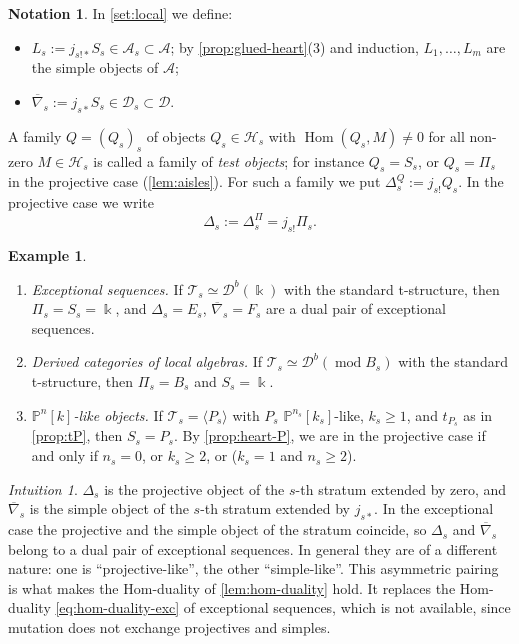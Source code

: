 \documentclass[11pt,reqno]{amsart}
\theoremstyle{plain}
\theoremstyle{definition}
\newtheorem{example}[theorem]{Example}
\newtheorem{notation}[theorem]{Notation}
\theoremstyle{remark}
\newtheorem*{intuition}{Intuition}
\newcommand{\kk}{\Bbbk}
\DeclareMathOperator{\Hom}{Hom}
\newcommand{\modd}{\operatorname{mod}}
\newcommand{\Db}{\mathcal{D}^b}
\newcommand{\thick}[1]{\langle #1\rangle}
\newcommand{\Pn}[2]{\mathbb{P}^{#1}[#2]}
\newcommand{\nablabar}{\overline{\nabla}}
\newcommand{\cD}{\mathcal{D}}
\newcommand{\cA}{\mathcal{A}}
\newcommand{\cH}{\mathcal{H}}
\newcommand{\cT}{\mathcal{T}}
\begin{document}
\begin{notation}\label{not:objects}
In \cref{set:local} we define:
\begin{itemize}
\item $L_s:=j_{s!*}S_s\in\cA_s\subset\cA$; by \cref{prop:glued-heart}(3) and induction, $L_1,\dots,L_m$ are the simple objects of $\cA$;
\item $\nablabar_s:=j_{s*}S_s\in\cD_s\subset\cD$.
\end{itemize}
A family $Q=(Q_s)_s$ of objects $Q_s\in\cH_s$ with $\Hom(Q_s,M)\ne0$ for all non-zero $M\in\cH_s$ is called a family of \emph{test objects}; for instance $Q_s=S_s$, or $Q_s=\Pi_s$ in the projective case (\cref{lem:aisles}). For such a family we put $\Delta^Q_s:=j_{s!}Q_s$. In the projective case we write
\[\Delta_s:=\Delta^\Pi_s=j_{s!}\Pi_s .\]
\end{notation}

\begin{example}\label{ex:local-settings}
\leavevmode
\begin{enumerate}
\item \emph{Exceptional sequences.} If $\cT_s\simeq\Db(\kk)$ with the standard t-structure, then $\Pi_s=S_s=\kk$, and $\Delta_s=E_s$, $\nablabar_s=F_s$ are a dual pair of exceptional sequences.
\item \emph{Derived categories of local algebras.} If $\cT_s\simeq\Db(\modd B_s)$ with the standard t-structure, then $\Pi_s=B_s$ and $S_s=\kk$.
\item \emph{$\Pn nk$-like objects.} If $\cT_s=\thick{P_s}$ with $P_s$ $\Pn{n_s}{k_s}$-like, $k_s\ge1$, and $t_{P_s}$ as in \cref{prop:tP}, then $S_s=P_s$. By \cref{prop:heart-P}, we are in the projective case if and only if $n_s=0$, or $k_s\ge2$, or ($k_s=1$ and $n_s\ge2$).
\end{enumerate}
\end{example}

\begin{intuition}
$\Delta_s$ is the projective object of the $s$-th stratum extended by zero, and $\nablabar_s$ is the simple object of the $s$-th stratum extended by $j_{s*}$. In the exceptional case the projective and the simple object of the stratum coincide, so $\Delta_s$ and $\nablabar_s$ belong to a dual pair of exceptional sequences. In general they are of a different nature: one is ``projective-like'', the other ``simple-like''. This asymmetric pairing is what makes the Hom-duality of \cref{lem:hom-duality} hold. It replaces the Hom-duality \eqref{eq:hom-duality-exc} of exceptional sequences, which is not available, since mutation does not exchange projectives and simples.
\end{intuition}
\end{document}
